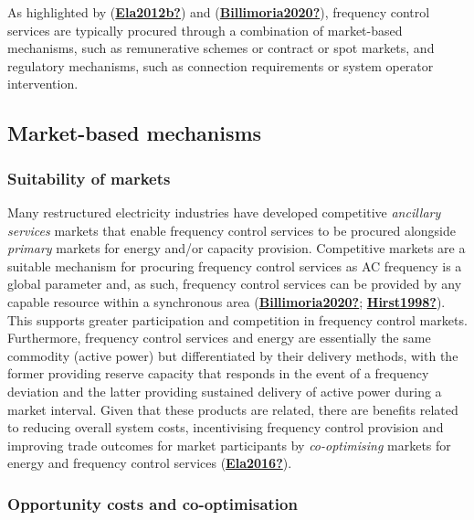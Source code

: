 \documentclass[12pt,a4paper,]{report}
\begin{document}
As highlighted by (\protect\hyperlink{ref-Ela2012b}{\textbf{Ela2012b?}})
and (\protect\hyperlink{ref-Billimoria2020}{\textbf{Billimoria2020?}}),
frequency control services are typically procured through a combination
of market-based mechanisms, such as remunerative schemes or contract or
spot markets, and regulatory mechanisms, such as connection requirements
or system operator intervention.

\hypertarget{sec:market_mech}{%
\subsection{Market-based mechanisms}\label{sec:market_mech}}

\hypertarget{suitability-of-markets}{%
\subsubsection{Suitability of markets}\label{suitability-of-markets}}

Many restructured electricity industries have developed competitive
\emph{ancillary services} markets that enable frequency control services
to be procured alongside \emph{primary} markets for energy and/or
capacity provision. Competitive markets are a suitable mechanism for
procuring frequency control services as AC frequency is a global
parameter and, as such, frequency control services can be provided by
any capable resource within a synchronous area
(\protect\hyperlink{ref-Billimoria2020}{\textbf{Billimoria2020?}};
\protect\hyperlink{ref-Hirst1998}{\textbf{Hirst1998?}}). This supports
greater participation and competition in frequency control markets.
Furthermore, frequency control services and energy are essentially the
same commodity (active power) but differentiated by their delivery
methods, with the former providing reserve capacity that responds in the
event of a frequency deviation and the latter providing sustained
delivery of active power during a market interval. Given that these
products are related, there are benefits related to reducing overall
system costs, incentivising frequency control provision and improving
trade outcomes for market participants by \emph{co-optimising} markets
for energy and frequency control services
(\protect\hyperlink{ref-Ela2016}{\textbf{Ela2016?}}).

\hypertarget{opportunity-costs-and-co-optimisation}{%
\subsubsection{Opportunity costs and
co-optimisation}\label{opportunity-costs-and-co-optimisation}}
\end{document}
